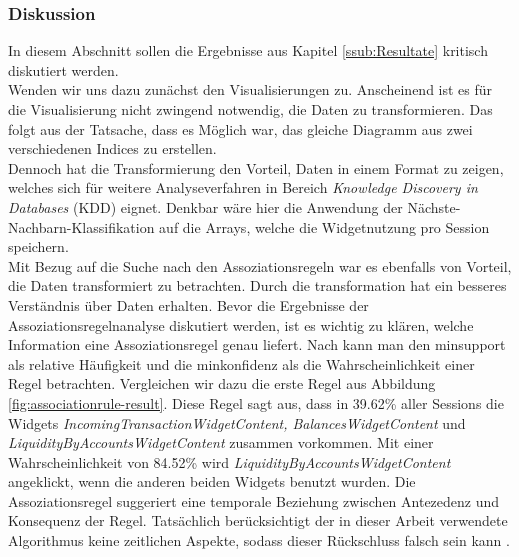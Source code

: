 \subsubsection{Diskussion}
\label{ssub:Diskussion}
In diesem Abschnitt sollen die Ergebnisse aus Kapitel \ref{ssub:Resultate} kritisch diskutiert werden.\\
Wenden wir uns dazu zunächst den Visualisierungen zu. Anscheinend ist es für die Visualisierung nicht zwingend notwendig, die Daten zu transformieren. Das folgt aus der Tatsache, dass es Möglich war, das gleiche Diagramm aus zwei verschiedenen Indices zu erstellen.\\
Dennoch hat die Transformierung den Vorteil, Daten in einem Format zu zeigen, welches sich für weitere Analyseverfahren in Bereich \textit{Knowledge Discovery in Databases} (KDD) eignet. Denkbar wäre hier die Anwendung der Nächste-Nachbarn-Klassifikation \citep{EsSa00} auf die Arrays, welche die Widgetnutzung pro Session speichern.\\
Mit Bezug auf die Suche nach den Assoziationsregeln war es ebenfalls von Vorteil, die Daten transformiert zu betrachten. Durch die transformation hat ein besseres Verständnis über Daten erhalten.
\newline
Bevor die Ergebnisse der Assoziationsregelnanalyse diskutiert werden, ist es wichtig zu klären, welche Information eine Assoziationsregel genau liefert. Nach \citet{BeKe19} kann man den minsupport als relative Häufigkeit und die minkonfidenz als die Wahrscheinlichkeit einer Regel betrachten. Vergleichen wir dazu die erste Regel aus Abbildung \ref{fig:associationrule-result}. Diese Regel sagt aus, dass in 39.62\% aller Sessions die Widgets \textit{IncomingTransactionWidgetContent, BalancesWidgetContent} und \textit{LiquidityByAccountsWidgetContent} zusammen vorkommen. Mit einer Wahrscheinlichkeit von 84.52\% wird \textit{LiquidityByAccountsWidgetContent} angeklickt, wenn die anderen beiden Widgets benutzt wurden. Die Assoziationsregel suggeriert eine temporale Beziehung zwischen Antezedenz und Konsequenz der Regel. Tatsächlich berücksichtigt der in dieser Arbeit verwendete Algorithmus keine zeitlichen Aspekte, sodass dieser Rückschluss falsch sein kann \citep{Be03}.\\

